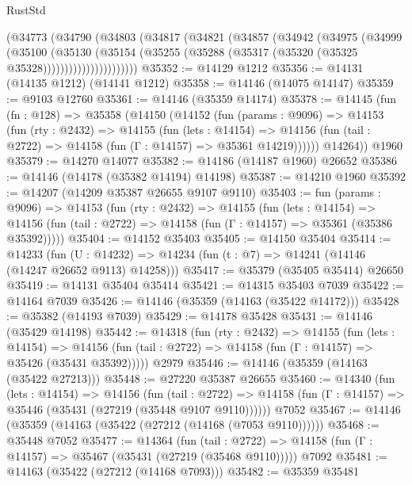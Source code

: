 \begin{lexlean}{RustStd}
\begin{coremodule}
              (@34773
                (@34790
                  (@34803
                    (@34817
                      (@34821
                        (@34857
                          (@34942
                            (@34975
                              (@34999
                                (@35100
                                  (@35130
                                    (@35154
                                      (@35255
                                        (@35288 (@35317 (@35320 (@35325 @35328))))))))))))))))))))))
@35352 := @14129 @1212
@35356 := @14131 (@14135 @1212) (@14141 @1212)
@35358 := @14146 (@14075 @14147)
@35359 := @9103 @12760
@35361 := @14146 (@35359 @14174)
@35378 := @14145
    (fun (fn : @128) =>
    @35358
      (@14150
        (@14152
          (fun (params : @9096) =>
          @14153
            (fun (rty : @2432) =>
            @14155
              (fun (lets : @14154) =>
              @14156 (fun (tail : @2722) => @14158 (fun (Γ : @14157) => @35361 @14219))))))
        @14264))
    @1960
@35379 := @14270 @14077
@35382 := @14186 (@14187 @1960) @26652
@35386 := @14146 (@14178 (@35382 @14194) @14198)
@35387 := @14210 @1960
@35392 := @14207 (@14209 @35387 @26655 @9107 @9110)
@35403 := fun (params : @9096) =>
  @14153
    (fun (rty : @2432) =>
    @14155
      (fun (lets : @14154) =>
      @14156 (fun (tail : @2722) => @14158 (fun (Γ : @14157) => @35361 (@35386 @35392)))))
@35404 := @14152 @35403
@35405 := @14150 @35404
@35414 := @14233
    (fun (U : @14232) => @14234 (fun (t : @7) => @14241 (@14146 (@14247 @26652 @9113) @14258)))
@35417 := @35379 (@35405 @35414) @26650
@35419 := @14131 @35404 @35414
@35421 := @14315 @35403 @7039
@35422 := @14164 @7039
@35426 := @14146 (@35359 (@14163 (@35422 @14172)))
@35428 := @35382 (@14193 @7039)
@35429 := @14178 @35428
@35431 := @14146 (@35429 @14198)
@35442 := @14318
    (fun (rty : @2432) =>
    @14155
      (fun (lets : @14154) =>
      @14156 (fun (tail : @2722) => @14158 (fun (Γ : @14157) => @35426 (@35431 @35392)))))
    @2979
@35446 := @14146 (@35359 (@14163 (@35422 @27213)))
@35448 := @27220 @35387 @26655
@35460 := @14340
    (fun (lets : @14154) =>
    @14156
      (fun (tail : @2722) =>
      @14158 (fun (Γ : @14157) => @35446 (@35431 (@27219 (@35448 @9107 @9110))))))
    @7052
@35467 := @14146 (@35359 (@14163 (@35422 (@27212 (@14168 (@7053 @9110))))))
@35468 := @35448 @7052
@35477 := @14364
    (fun (tail : @2722) => @14158 (fun (Γ : @14157) => @35467 (@35431 (@27219 (@35468 @9110)))))
    @7092
@35481 := @14163 (@35422 (@27212 (@14168 @7093)))
@35482 := @35359 @35481

\end{coremodule}
\end{lexlean}
